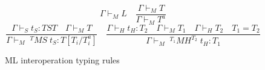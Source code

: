 \begin{figure}
\[
\Gamma\vdash_{M}L
\quad
\frac{\Gamma\vdash_{M}T}{\Gamma\vdash_{M}T^{a}}
\]
\[
\frac{\Gamma\vdash_{S}t_{S}:TST\quad\Gamma\vdash_{M}T}{\Gamma\vdash_{M}\;^{T}MS\;t_{S}:T[T_{i}/T^{a}_{i}]}
\quad
\frac{\Gamma\vdash_{H}t_{H}:T_{2}\quad\Gamma\vdash_{M}T_{1}\quad\Gamma\vdash_{H}T_{2}\quad T_{1}=T_{2}}{\Gamma\vdash_{M}\;^{T_{1}}MH^{T_{2}}\;t_{H}:T_{1}}
\]
\caption{ML interoperation typing rules}
\label{mitr}
\end{figure}